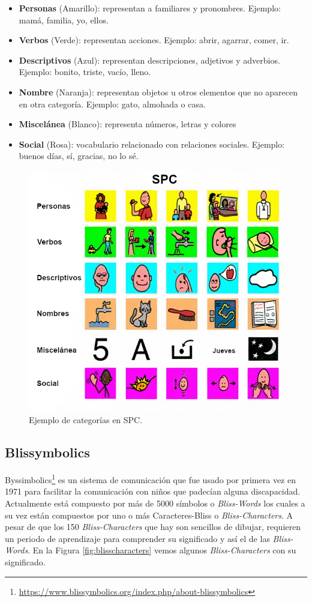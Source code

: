 \begin{itemize}
	\item \textbf{Personas} (Amarillo): representan a familiares y pronombres. Ejemplo: mamá, familia,  yo, ellos.
	\item \textbf{Verbos} (Verde): representan acciones. Ejemplo: abrir, agarrar, comer, ir.
	\item \textbf{Descriptivos} (Azul): representan descripciones, adjetivos y adverbios. Ejemplo: bonito, triste, vacío, lleno.
	\item \textbf{Nombre} (Naranja): representan objetos u otros elementos que no aparecen en otra categoría. Ejemplo: gato, almohada o casa.
	\item \textbf{Miscelánea} (Blanco): representa números, letras y colores
	\item \textbf{Social} (Rosa): vocabulario relacionado con relaciones sociales. Ejemplo: buenos días, sí, gracias, no lo sé.
	
\end{itemize}

\begin{figure}[h!]
	\centering
	\includegraphics[width=0.8\linewidth]{Imagenes/Bitmap/SPCcolores}
	\caption{Ejemplo de categorías en SPC.}
	\label{fig:spccolores}
\end{figure}

\subsection{Blissymbolics}
Byssimbolics\footnote{\url{https://www.blissymbolics.org/index.php/about-blissymbolics}}
es un sistema de comunicación que fue usado por primera vez en 1971 para facilitar la comunicación con niños que padecían alguna discapacidad. Actualmente está compuesto por más de 5000 símbolos o  \textit{Bliss-Words} los cuales a su vez están compuestos por uno o más Caracteres-Bliss o  \textit{Bliss-Characters}. A pesar de que los 150 \textit{Bliss-Characters} que hay son sencillos de dibujar, requieren un periodo de aprendizaje para comprender su significado y así el de las \textit{Bliss-Words}. En la Figura \ref{fig:blisscharacters} vemos algunos \textit{Bliss-Characters} con su significado. \\

